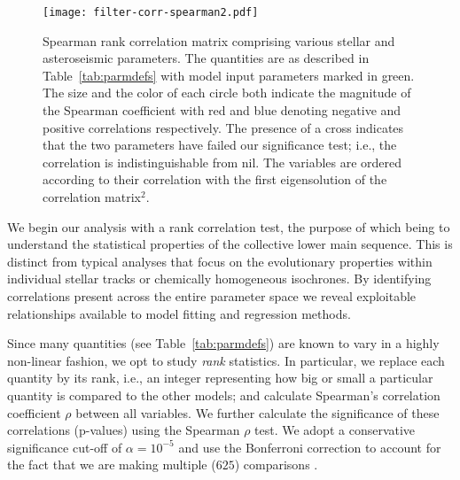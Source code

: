 \begin{figure*}
    \centering
    \texttt{[image: filter-corr-spearman2.pdf]}
    \caption[Rank correlation diagram]{Spearman rank correlation matrix comprising various stellar and asteroseismic parameters. The quantities are as described in Table~\ref{tab:parmdefs}
    with model input parameters marked in green.
    The size and the color of each circle both indicate the magnitude of the Spearman coefficient with red and blue denoting negative and positive correlations respectively.  The presence of a cross indicates that 
the two parameters have failed our significance test; i.e., the correlation is indistinguishable from nil. 
The variables are ordered according to their correlation with the first eigensolution of the correlation matrix$^2$.}
    \label{fig:filt_corr}
\end{figure*}

%

We begin our analysis with a rank correlation test, the purpose of which being to understand the 
statistical properties of the collective lower main sequence.
This is distinct from typical analyses that focus on the evolutionary properties within 
individual stellar tracks or chemically homogeneous isochrones. By identifying correlations present across the entire parameter space we reveal exploitable relationships available to model fitting and regression methods. 


Since many quantities (see Table~\ref{tab:parmdefs}) are known to vary in a highly non-linear fashion, we opt to study \emph{rank} statistics. In particular, we replace each quantity by its rank, i.e., an integer representing how big or small a particular quantity is compared to the other models; and calculate Spearman's correlation coefficient $\rho$ between all variables. We further calculate the significance of these correlations (p-values) using the Spearman $\rho$ test. We adopt a conservative significance cut-off of ${\alpha = 10^{-5}}$ and use the Bonferroni correction to account for the fact that we are making multiple ($625$) comparisons \citep[e.g.,][]{doi:10.1080/01621459.1955.10501294}. 

